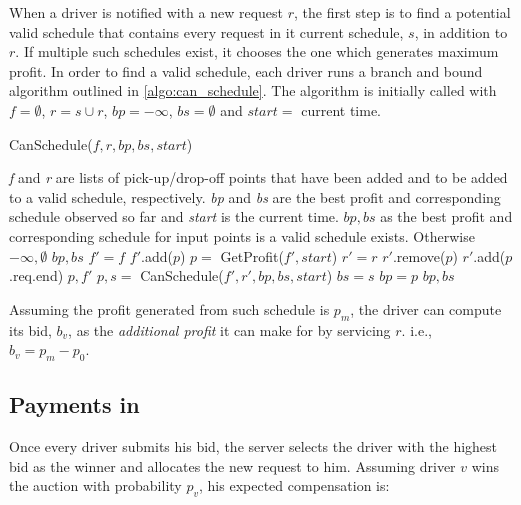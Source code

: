 When a driver is notified with a new request $r$, the first step is to find a potential valid schedule that contains every request in it current schedule, $s$, in addition to $r$. If multiple such schedules exist, it chooses the one which generates maximum profit. In order to find a valid schedule, each driver runs a branch and bound algorithm outlined in \cref{algo:can_schedule}. The algorithm is initially called with $f = \emptyset$, $r = s \cup r$, $bp = -\infty$, $bs = \emptyset$ and $start =$ current time. 

\begin{algorithm}[t]
\caption{CanSchedule($f, r, bp, bs, start$)}
\label{algo:can_schedule}
\begin{algorithmic}[1]
\REQUIRE \emph{f} and \emph{r} are lists of pick-up/drop-off points that have been added and to be added to a valid schedule, respectively. \emph{bp} and \emph{bs} are the best profit and corresponding schedule observed so far and \emph{start} is the current time.
\ENSURE $bp, bs$ as the best profit and corresponding schedule for input points is a valid schedule exists. Otherwise $-\infty, \emptyset$
	\RETURN $bp, bs$
\ENDIF
{}
	\STATE $f' = f$
	\STATE $f'$.add($p$)
	\STATE $p =$ GetProfit($f', start$)
		\STATE $r' = r$
		\STATE $r'$.remove($p$)
			\STATE $r'$.add($p$.req.end)
		\ENDIF
			\RETURN $p, f'$
		\ENDIF
		\STATE $p, s =$ CanSchedule($f', r', bp, bs, start$)
			\STATE $bs = s$
			\STATE $bp = p$
		\ENDIF
	\ENDIF
\ENDFOR
\RETURN $bp, bs$
\end{algorithmic}
\end{algorithm}

Assuming the profit generated from such schedule is $p_m$, the driver can compute its bid, $b_v$, as the \textit{additional profit} it can make for \fname by servicing $r$. i.e., $b_v = p_m - p_0$. 

\subsection{Payments in \fname}

Once every driver submits his bid, the server selects the driver with the highest bid as the winner and allocates the new request to him. Assuming driver $v$ wins the auction with probability $p_v$, his expected compensation is: 

